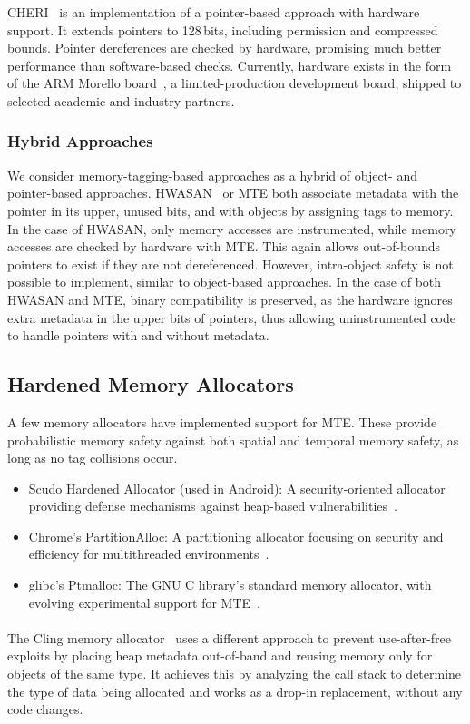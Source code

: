 CHERI~\cite{woodruff2014cheri} is an implementation of a pointer-based approach with hardware support.
It extends pointers to 128\,bits, including permission and compressed bounds.
Pointer dereferences are checked by hardware, promising much better performance than software-based checks.
Currently, hardware exists in the form of the ARM Morello board~\cite{UCAM-CL-TR-982}, a limited-production development board, shipped to selected academic and industry partners.

\subsubsection{Hybrid Approaches}

We consider memory-tagging-based approaches as a hybrid of object- and pointer-based approaches.
\Ac{HWASAN}~\cite{serebryany2018memory} or \ac{MTE} both associate metadata with the pointer in its upper, unused bits, and with objects by assigning tags to memory.
In the case of \ac{HWASAN}, only memory accesses are instrumented, while memory accesses are checked by hardware with \ac{MTE}.
This again allows out-of-bounds pointers to exist if they are not dereferenced.
However, intra-object safety is not possible to implement, similar to object-based approaches.
In the case of both \ac{HWASAN} and \ac{MTE}, binary compatibility is preserved, as the hardware ignores extra metadata in the upper bits of pointers, thus allowing uninstrumented code to handle pointers with and without metadata.

\subsection{Hardened Memory Allocators}
\label{subsec:hardened-memory-allocators}

A few memory allocators have implemented support for \ac{MTE}.
These provide probabilistic memory safety against both spatial and temporal memory safety, as long as no tag collisions occur.

\begin{itemize}
    \item Scudo Hardened Allocator (used in Android): A security-oriented allocator providing defense mechanisms against heap-based vulnerabilities~\cite{scudo_allocator}.
    \item Chrome's PartitionAlloc: A partitioning allocator focusing on security and efficiency for multithreaded environments~\cite{chrome_partition_alloc}.
    \item glibc's Ptmalloc: The GNU C library's standard memory allocator, with evolving experimental support for \ac{MTE}~\cite{glibc_ptmalloc}.
\end{itemize}

\paragraph{}
The Cling memory allocator~\cite{akritidis2010cling} uses a different approach to prevent use-after-free exploits by placing heap metadata out-of-band and reusing memory only for objects of the same type.
It achieves this by analyzing the call stack to determine the type of data being allocated and works as a drop-in replacement, without any code changes.
